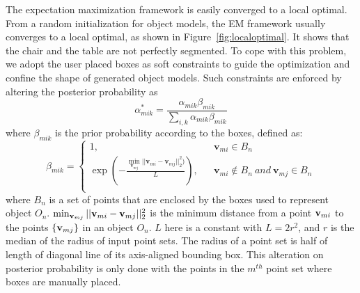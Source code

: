 The expectation maximization framework is easily converged to a local optimal. 
From a random initialization for object models, the EM framework usually converges to a local optimal, as shown in Figure~\ref{fig:localoptimal}. It shows that the chair and the table are not perfectly segmented.
%
To cope with this problem, we adopt the user placed boxes as soft constraints to guide the optimization and confine the shape of generated object models. 
Such constraints are enforced by altering the posterior probability as
\begin{equation}
	\label{equ:alteralpha}
	\alpha_{mik}^*=\frac{\alpha_{mik}\beta_{mik}}{\sum_{i,k}\alpha_{mik}\beta_{mik}}
\end{equation}
%
where $\beta_{mik}$ is the prior probability according to the boxes, defined as:
\begin{equation}
	\beta_{mik}=\left\{
	\begin{array}{lcl}
		1,& &\mathbf v_{mi} \in B_n\\
		\exp(-\frac{\min_{\mathbf v_{mj}}|| \mathbf v_{mi} - \mathbf v_{mj} ||_2^2  )}{L}),& &\mathbf v_{mi} \notin B_n~and~\mathbf v_{mj} \in B_n\\
	\end{array} \right.
\end{equation}
%
where $B_n$ is a set of points that are enclosed by the boxes used to represent object $O_{n}$. 
%
$\min_{\mathbf{v}_{mj}}|| \mathbf{v}_{mi} - \mathbf{v}_{mj} ||_2^2$ is the minimum distance from a point $\mathbf{v}_{mi}$ to the points $\{\mathbf{v}_{mj}\}$ in an object $O_n$.
$L$ here is a constant with $L=2r^2$, and $r$ is the median of the radius of input point sets.
%
The radius of a point set is half of length of diagonal line of its axis-aligned bounding box.   
%
This alteration on posterior probability is only done with the points in the $m^{th}$ point set where boxes are manually placed. 
%

